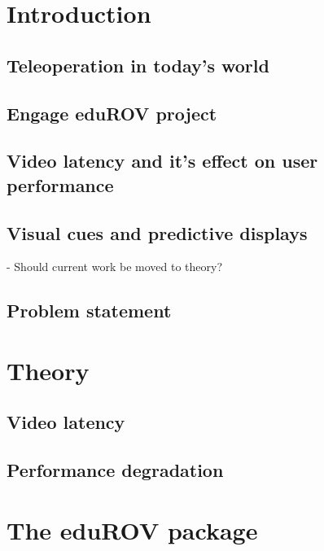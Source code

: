 \documentclass[b5paper,10pt,twoside]{book}
\begin{document}
%




{
\tableofcontents
}
{
\chapter{Introduction}
	\section{Teleoperation in today's world}
	\section{Engage eduROV project}
	\section{Video latency and it's effect on user performance}
	\section{Visual cues and predictive displays}
	- Should current work be moved to theory?
	\section{Problem statement}
	
\chapter{Theory}
	\section{Video latency}
	\section{Performance degradation}
	
\chapter{The eduROV package}
}
\end{document}
